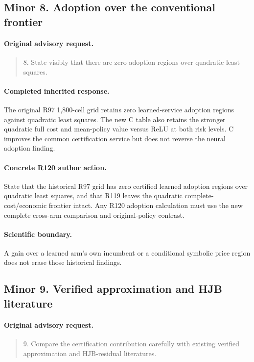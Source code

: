 \subsection{Minor 8. Adoption over the conventional frontier}
\label{response120:minor-8}
\paragraph{Original advisory request.}
\begin{quote}
8. State visibly that there are zero adoption regions over quadratic least squares.
\end{quote}
\paragraph{Completed inherited response.}
The original R97 1,800-cell grid retains zero learned-service adoption regions against quadratic least squares. The new C table also retains the stronger quadratic full cost and mean-policy value versus ReLU at both risk levels. C improves the common certification service but does not reverse the neural adoption finding.
\paragraph{Concrete R120 author action.}
State that the historical R97 grid has zero certified learned adoption regions over quadratic least squares, and that R119 leaves the quadratic complete-cost/economic frontier intact. Any R120 adoption calculation must use the new complete cross-arm comparison and original-policy contrast.
\paragraph{Scientific boundary.}
A gain over a learned arm's own incumbent or a conditional symbolic price region does not erase those historical findings.

\subsection{Minor 9. Verified approximation and HJB literature}
\label{response120:minor-9}
\paragraph{Original advisory request.}
\begin{quote}
9. Compare the certification contribution carefully with existing verified approximation and HJB-residual literatures.
\end{quote}
